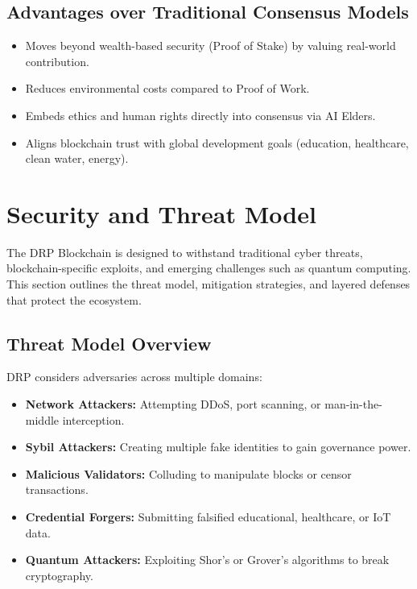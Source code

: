 \documentclass[11pt,a4paper]{article}
\begin{document}
\subsection{Advantages over Traditional Consensus Models}
\begin{itemize}
    \item Moves beyond wealth-based security (Proof of Stake) by valuing real-world contribution.  
    \item Reduces environmental costs compared to Proof of Work.  
    \item Embeds ethics and human rights directly into consensus via AI Elders.  
    \item Aligns blockchain trust with global development goals (education, healthcare, clean water, energy).  
\end{itemize}

\section{Security and Threat Model}

The DRP Blockchain is designed to withstand traditional cyber threats, blockchain-specific exploits, and emerging challenges such as quantum computing. This section outlines the threat model, mitigation strategies, and layered defenses that protect the ecosystem.  

\subsection{Threat Model Overview}
DRP considers adversaries across multiple domains:
\begin{itemize}
    \item \textbf{Network Attackers:} Attempting DDoS, port scanning, or man-in-the-middle interception.  
    \item \textbf{Sybil Attackers:} Creating multiple fake identities to gain governance power.  
    \item \textbf{Malicious Validators:} Colluding to manipulate blocks or censor transactions.  
    \item \textbf{Credential Forgers:} Submitting falsified educational, healthcare, or IoT data.  
    \item \textbf{Quantum Attackers:} Exploiting Shor’s or Grover’s algorithms to break cryptography.  
\end{itemize}
\end{document}
